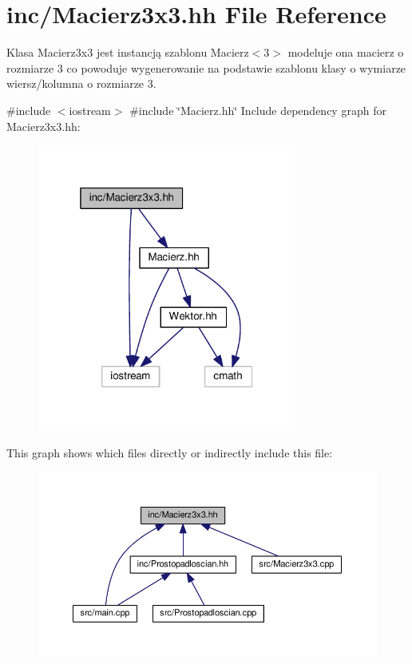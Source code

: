 \hypertarget{Macierz3x3_8hh}{}\section{inc/\+Macierz3x3.hh File Reference}
\label{Macierz3x3_8hh}


Klasa Macierz3x3 jest instancją szablonu Macierz$<$3$>$ modeluje ona macierz o rozmiarze 3 co powoduje wygenerowanie na podstawie szablonu klasy o wymiarze wiersz/kolumna o rozmiarze 3.  


{\ttfamily \#include $<$iostream$>$}\newline
{\ttfamily \#include \char`\"{}Macierz.\+hh\char`\"{}}\newline
Include dependency graph for Macierz3x3.\+hh\+:\nopagebreak
\begin{figure}[H]
\begin{center}
\leavevmode
\includegraphics[width=241pt]{Macierz3x3_8hh__incl}
\end{center}
\end{figure}
This graph shows which files directly or indirectly include this file\+:\nopagebreak
\begin{figure}[H]
\begin{center}
\leavevmode
\includegraphics[width=350pt]{Macierz3x3_8hh__dep__incl}
\end{center}
\end{figure}
